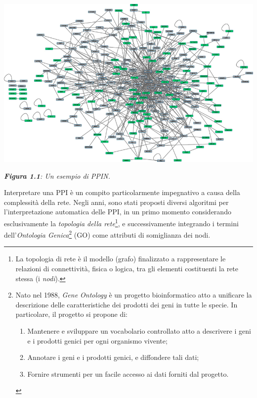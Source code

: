 \documentclass[11pt]{article}
\begin{document}
\begin{center}
\includegraphics[scale=0.46]{woo}

\begin{small}\textit{\textbf{Figura 1.1}: Un esempio di PPIN.}\end{small}
\end{center}

Interpretare una PPI è un compito particolarmente impegnativo a causa della complessità della rete. Negli anni, sono stati proposti diversi algoritmi per l'interpretazione automatica delle PPI, in un primo momento considerando esclusivamente la \textit{topologia della rete}\footnote{La topologia di rete è il modello (grafo) finalizzato a rappresentare le relazioni di connettività, fisica o logica, tra gli elementi costituenti la rete stessa (i \textit{nodi}).}, e successivamente integrando i termini dell'\textit{Ontologia Genica}\footnote{Nato nel 1988, \textit{Gene Ontology} è un progetto bioinformatico atto a unificare la descrizione delle caratteristiche dei prodotti dei geni in tutte le specie. In particolare, il progetto si propone di: 
\begin{enumerate}
\setlength{\itemsep}{1pt}
  \setlength{\parskip}{0pt}
  \setlength{\parsep}{0pt}
\item Mantenere e sviluppare un vocabolario controllato atto a descrivere i geni e i prodotti genici per ogni organismo vivente;
\item Annotare i geni e i prodotti genici, e diffondere tali dati;
\item Fornire strumenti per un facile accesso ai dati forniti dal progetto.
\end{enumerate} 
} (GO) come attributi di somiglianza dei nodi. 
\end{document}
